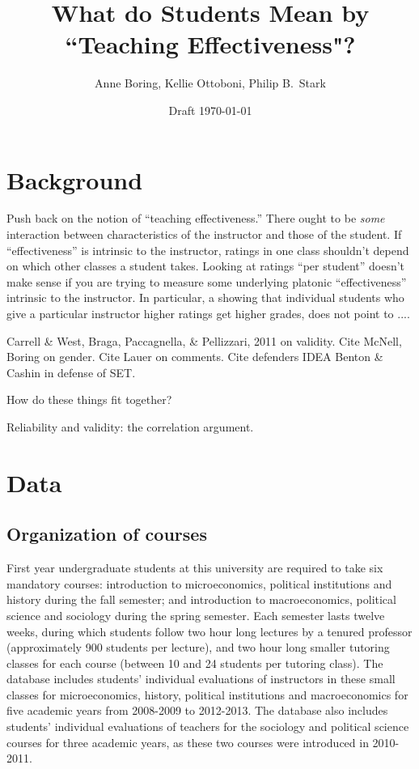 \documentclass[12pt]{article}
\title{What do Students Mean by ``Teaching Effectiveness"?}
\author{Anne Boring, Kellie Ottoboni, Philip B.~Stark}
\date{Draft \today}
\newcommand{\todo}[1]{{\color{red}{TO DO: \sc #1}}}
\begin{document}
\maketitle

\section{Background}
Push back on the notion of ``teaching effectiveness.''
There ought to be \emph{some} interaction between characteristics of the
instructor and those of the student.
If ``effectiveness'' is intrinsic to the instructor, ratings in one class shouldn't depend on
which other classes a student takes.
Looking at ratings ``per student'' doesn't make sense if you are trying to
measure some underlying platonic ``effectiveness'' intrinsic to the instructor.
In particular,  a showing that individual students who give a particular instructor higher ratings
get higher grades, does not point to ....\todo{fix me}

Carrell \& West, Braga, Paccagnella, \& Pellizzari, 2011 on validity.
Cite McNell, Boring on gender.
Cite Lauer on comments.
Cite defenders IDEA Benton \& Cashin in defense of SET.  

How do these things fit together?

Reliability and validity: the correlation argument.

\section{Data}
\subsection{Organization of courses}

First year undergraduate students at this university are required to take six mandatory courses: introduction to 
microeconomics, political institutions and history during the fall semester; and introduction to macroeconomics, political 
science and sociology during the spring semester. Each semester lasts twelve weeks, during which 
students follow two hour long lectures by a tenured professor
(approximately 900 students per lecture), and two hour long smaller tutoring classes for each course 
(between 10 and 24 students per tutoring class). The database includes students' individual evaluations of instructors 
in these small classes for microeconomics, history, political institutions and macroeconomics for five academic years from 
2008-2009 to 2012-2013. The database also includes students' individual evaluations of teachers for the sociology and
political science courses for three academic years, as these two courses were introduced in 2010-2011.
\end{document}
